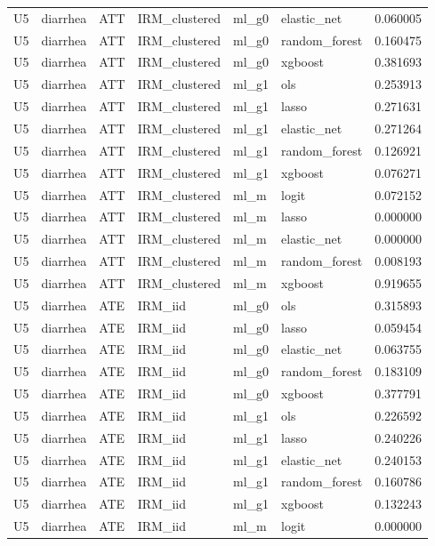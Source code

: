 \begin{longtable}{llllllr}
U5 & diarrhea & ATT & IRM\_clustered & ml\_g0 & elastic\_net & 0.060005 \\
U5 & diarrhea & ATT & IRM\_clustered & ml\_g0 & random\_forest & 0.160475 \\
U5 & diarrhea & ATT & IRM\_clustered & ml\_g0 & xgboost & 0.381693 \\
U5 & diarrhea & ATT & IRM\_clustered & ml\_g1 & ols & 0.253913 \\
U5 & diarrhea & ATT & IRM\_clustered & ml\_g1 & lasso & 0.271631 \\
U5 & diarrhea & ATT & IRM\_clustered & ml\_g1 & elastic\_net & 0.271264 \\
U5 & diarrhea & ATT & IRM\_clustered & ml\_g1 & random\_forest & 0.126921 \\
U5 & diarrhea & ATT & IRM\_clustered & ml\_g1 & xgboost & 0.076271 \\
U5 & diarrhea & ATT & IRM\_clustered & ml\_m & logit & 0.072152 \\
U5 & diarrhea & ATT & IRM\_clustered & ml\_m & lasso & 0.000000 \\
U5 & diarrhea & ATT & IRM\_clustered & ml\_m & elastic\_net & 0.000000 \\
U5 & diarrhea & ATT & IRM\_clustered & ml\_m & random\_forest & 0.008193 \\
U5 & diarrhea & ATT & IRM\_clustered & ml\_m & xgboost & 0.919655 \\
U5 & diarrhea & ATE & IRM\_iid & ml\_g0 & ols & 0.315893 \\
U5 & diarrhea & ATE & IRM\_iid & ml\_g0 & lasso & 0.059454 \\
U5 & diarrhea & ATE & IRM\_iid & ml\_g0 & elastic\_net & 0.063755 \\
U5 & diarrhea & ATE & IRM\_iid & ml\_g0 & random\_forest & 0.183109 \\
U5 & diarrhea & ATE & IRM\_iid & ml\_g0 & xgboost & 0.377791 \\
U5 & diarrhea & ATE & IRM\_iid & ml\_g1 & ols & 0.226592 \\
U5 & diarrhea & ATE & IRM\_iid & ml\_g1 & lasso & 0.240226 \\
U5 & diarrhea & ATE & IRM\_iid & ml\_g1 & elastic\_net & 0.240153 \\
U5 & diarrhea & ATE & IRM\_iid & ml\_g1 & random\_forest & 0.160786 \\
U5 & diarrhea & ATE & IRM\_iid & ml\_g1 & xgboost & 0.132243 \\
U5 & diarrhea & ATE & IRM\_iid & ml\_m & logit & 0.000000 \\

\end{longtable}
